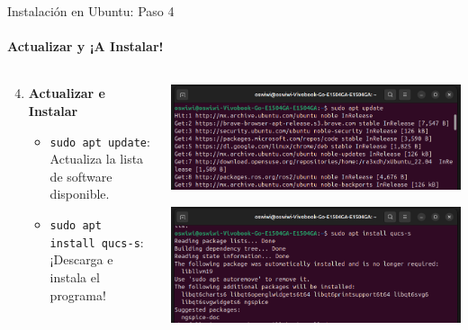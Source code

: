 \documentclass{beamer}
\begin{document}
\begin{frame}[fragile]{Instalación en Ubuntu: Paso 4}
  \framesubtitle{Actualizar y ¡A Instalar!}

  \begin{columns}[T]
    \begin{column}{0.5\textwidth}
      \begin{enumerate}
        \setcounter{enumi}{3} %
        \item \textbf{Actualizar e Instalar}
          \begin{itemize}
            \item \texttt{sudo apt update}: Actualiza la lista de software disponible.
            \item \texttt{sudo apt install qucs-s}: ¡Descarga e instala el programa!
          \end{itemize}
      \end{enumerate}
    \end{column}

    \begin{column}{0.5\textwidth}
      \includegraphics[width=\columnwidth]{Imagenes/InsP4-1.png}
      
      \vspace{0.3cm} %
      
      \includegraphics[width=\columnwidth]{Imagenes/InsP4-2.png}
    \end{column}
  \end{columns}
\end{frame}
\end{document}
